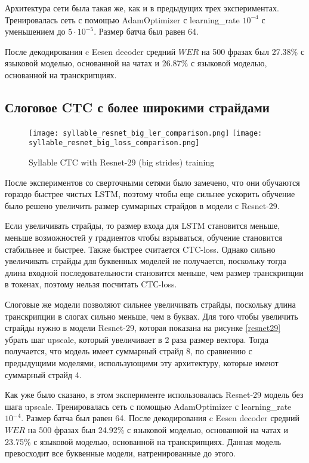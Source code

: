 \documentclass[a4paper,14pt]{extarticle}
\begin{document}
Архитектура сети была такая же, как и в предыдущих трех экспериментах. Тренировалась сеть с помощью AdamOptimizer с learning\_rate $10^{-4}$ с уменьшением до $5\cdot10^{-5}$. Размер батча был равен 64. 

После декодирования c Eesen decoder средний $WER$ на 500 фразах был 27.38\% с языковой моделью, основанной на чатах и 26.87\% с языковой моделью, основанной на транскрипциях. 

\subsection{Слоговое CTC с более широкими страйдами}
\begin{figure}[!ht]
	\texttt{[image: syllable\_resnet\_big\_ler\_comparison.png]}%
	\texttt{[image: syllable\_resnet\_big\_loss\_comparison.png]}
	\caption{Syllable CTC with Resnet-29 (big strides) training}
	\label{syllable_resnet_big_train}
\end{figure}
После экспериментов со сверточными сетями было замечено, что они обучаются гораздо быстрее чистых LSTM, поэтому чтобы еще сильнее ускорить обучение было решено увеличить размер суммарных страйдов в модели с Resnet-29. 

Если увеличивать страйды, то размер входа для LSTM становится меньше, меньше возможностей у градиентов чтобы взрываться, обучение становится стабильнее и быстрее. Также быстрее считается CTC-loss. Однако сильно увеличивать страйды для буквенных моделей не получается, поскольку тогда длина входной последовательности становится меньше, чем размер транскрипции в токенах, поэтому нельзя посчитать CTС-loss. 

Слоговые же модели позволяют сильнее увеличивать страйды, поскольку длина транскрипции в слогах сильно меньше, чем в буквах.  Для того чтобы увеличить страйды нужно в модели Resnet-29, которая показана на рисунке \ref{resnet29} убрать шаг upscale, который увеличивает в 2 раза размер вектора. Тогда получается, что модель имеет суммарный страйд 8, по сравнению с предыдущими моделями, использующими эту архитектуру, которые имеют суммарный страйд 4.
 
Как уже было сказано, в этом эксперименте использовалась Resnet-29 модель без шага upscale. Тренировалась сеть с помощью AdamOptimizer с learning\_rate $10^{-4}$. Размер батча был равен 64. После декодирования c Eesen decoder средний $WER$ на 500 фразах был 24.92\% с языковой моделью, основанной на чатах и 23.75\% с языковой моделью, основанной на транскрипциях. Данная модель превосходит все буквенные модели, натренированные до этого.
\pagebreak
\end{document}
